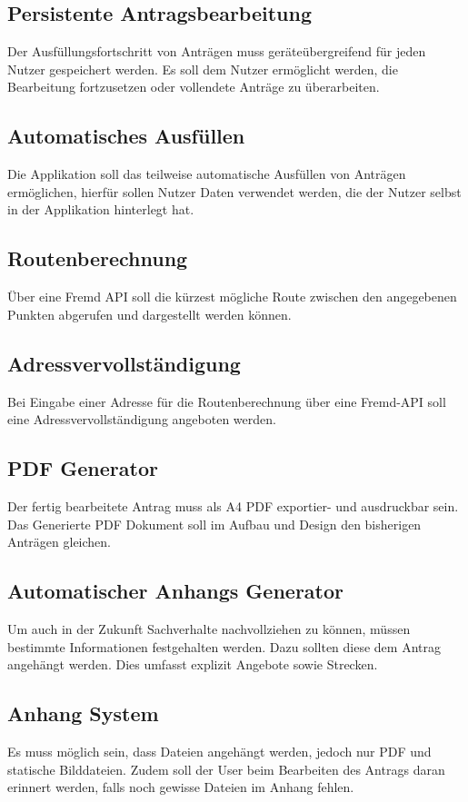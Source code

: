 \subsection{Persistente Antragsbearbeitung}\label{subsec:persistente-antragsbearbeitung}
Der Ausfüllungsfortschritt von Anträgen muss geräteübergreifend für jeden Nutzer gespeichert werden.
Es soll dem Nutzer ermöglicht werden, die Bearbeitung fortzusetzen oder vollendete Anträge zu überarbeiten.
\subsection{Automatisches Ausfüllen}\label{subsec:automatisches-ausfullen}
Die Applikation soll das teilweise automatische Ausfüllen von Anträgen ermöglichen, hierfür sollen Nutzer Daten verwendet werden,
die der Nutzer selbst in der Applikation hinterlegt hat.
\subsection{Routenberechnung}\label{subsec:routenberechnung}
Über eine Fremd API soll die kürzest mögliche Route zwischen den angegebenen Punkten abgerufen und dargestellt werden können.
\subsection{Adressvervollständigung}\label{subsec:adressvervollstandigung}
Bei Eingabe einer Adresse für die Routenberechnung über eine Fremd-API soll eine Adressvervollständigung angeboten werden.
\subsection{PDF Generator}\label{subsec:pdf-generator}
Der fertig bearbeitete Antrag muss als A4 PDF exportier- und ausdruckbar sein.
Das Generierte PDF Dokument soll im Aufbau und Design den bisherigen Anträgen gleichen.
\subsection{Automatischer Anhangs Generator}\label{subsec:automatischer-anhangs-generator}
Um auch in der Zukunft Sachverhalte nachvollziehen zu können, müssen bestimmte Informationen festgehalten werden.
Dazu sollten diese dem Antrag angehängt werden.
Dies umfasst explizit Angebote sowie Strecken.
\subsection{Anhang System}\label{subsec:anhang-system}
Es muss möglich sein, dass Dateien angehängt werden, jedoch nur PDF und statische Bilddateien.
Zudem soll der User beim Bearbeiten des Antrags daran erinnert werden, falls noch gewisse Dateien im Anhang fehlen.
